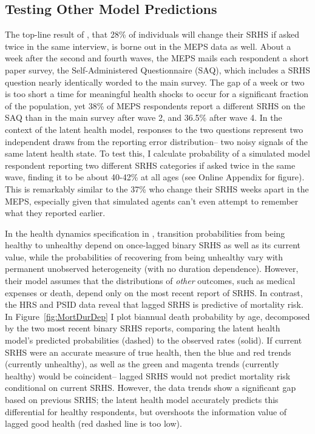 \documentclass[12pt,pdftex,letterpaper]{article}
\begin{document}
\subsection{Testing Other Model Predictions}\label{sec:Predictions}

The top-line result of \cite{Crossley02}, that 28\% of individuals will change their SRHS if asked twice in the same interview, is borne out in the MEPS data as well.  About a week after the second and fourth waves, the MEPS mails each respondent a short paper survey, the Self-Administered Questionnaire (SAQ), which includes a SRHS question nearly identically worded to the main survey. The gap of a week or two is too short a time for meaningful health shocks to occur for a significant fraction of the population, yet 38\% of MEPS respondents report a different SRHS on the SAQ than in the main survey after wave 2, and 36.5\% after wave 4.  In the context of the latent health model, responses to the two questions represent two independent draws from the reporting error distribution-- two noisy signals of the same latent health state. To test this, I calculate probability of a simulated model respondent reporting two different SRHS categories if asked twice in the same wave, finding it to be about 40-42\% at all ages (see Online Appendix for figure). This is remarkably similar to the 37\% who change their SRHS weeks apart in the MEPS, especially given that simulated agents can't even attempt to remember what they reported earlier.

In the health dynamics specification in \cite{DeNardi18}, transition probabilities from being healthy to unhealthy depend on once-lagged binary SRHS as well as its current value, while the probabilities of recovering from being unhealthy vary with permanent unobserved heterogeneity (with no duration dependence). However, their model assumes that the distributions of \textit{other} outcomes, such as medical expenses or death, depend only on the most recent report of SRHS. In contrast, the HRS and PSID data reveal that lagged SRHS is predictive of mortality risk. In Figure~\ref{fig:MortDurDep} I plot biannual death probability by age, decomposed by the two most recent binary SRHS reports, comparing the latent health model's predicted probabilities (dashed) to the observed rates (solid). If current SRHS were an accurate measure of true health, then the blue and red trends (currently unhealthy), as well as the green and magenta trends (currently healthy) would be coincident-- lagged SRHS would not predict mortality risk conditional on current SRHS. However, the data trends show a significant gap based on previous SRHS; the latent health model accurately predicts this differential for healthy respondents, but overshoots the information value of lagged good health (red dashed line is too low).
\end{document}
